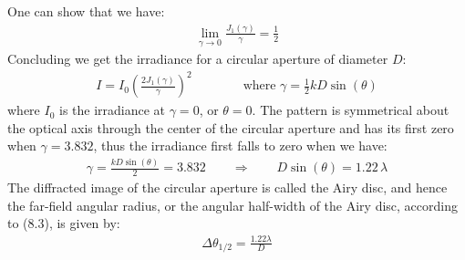 \documentclass[11pt]{book}
\theoremstyle{break}
\theoremstyle{break}
\begin{document}
One can show that we have:
\begin{align*}
\lim_{\gamma \to 0}\frac{J_1(\gamma)}{\gamma} = \frac{1}{2}
\end{align*}
Concluding we get the irradiance for a circular aperture of diameter $D$:
\begin{align*}
I = I_0 \left( \frac{2J_1(\gamma)}{\gamma}\right)^2 \qquad \qquad \text{where }\gamma = \frac{1}{2}kD\sin(\theta)
\end{align*}
where $I_0 $ is the irradiance at $\gamma =0$, or $\theta = 0$. The pattern is symmetrical about the optical axis through the center of the circular aperture and has its first zero when $\gamma = 3.832$, thus the irradiance first falls to zero when we have:
\begin{align}
\gamma = \frac{kD\sin(\theta)}{2} = 3.832 \qquad \Rightarrow \qquad D \sin(\theta) = 1.22 \, \lambda
\end{align}
The diffracted image of the circular aperture is called the Airy disc, and hence the far-field angular radius, or the angular half-width of the Airy disc, according to (8.3), is given by:
\begin{align*}
\Delta\theta_{1/2} = \frac{1.22 \lambda }{D}
\end{align*}
\end{document}
